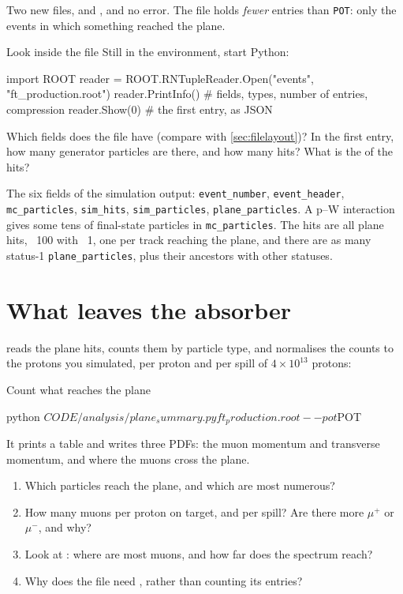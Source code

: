 \begin{checkpoint}
Two new files,  and
, and no error. The file holds
\emph{fewer} entries than \texttt{POT}: only the events in which something
reached the plane.
\end{checkpoint}

\begin{exercise}{Look inside the file}
\label{ex:openfile}
Still in the  environment, start Python:
\begin{py}
import ROOT
reader = ROOT.RNTupleReader.Open("events", "ft_production.root")
reader.PrintInfo()     # fields, types, number of entries, compression
reader.Show(0)         # the first entry, as JSON
\end{py}
Which fields does the file have (compare with \cref{sec:filelayout})? In the
first entry, how many generator particles are there, and how many hits? What
is the  of the hits?
\end{exercise}

\begin{solution}
The six fields of the simulation output: \texttt{event\_number},
\texttt{event\_header}, \texttt{mc\_particles}, \texttt{sim\_hits},
\texttt{sim\_particles}, \texttt{plane\_particles}. A p--W interaction gives
some tens of final-state particles in \texttt{mc\_particles}. The hits are
all plane hits, ~100 with ~1,
one per track reaching the plane, and there are as many status-1
\texttt{plane\_particles}, plus their ancestors with other statuses.
\end{solution}

\section{What leaves the absorber}

 reads the plane hits, counts them by
particle type, and normalises the counts to the protons you simulated, per
proton and per spill of $4\times10^{13}$ protons:

\begin{exercise}{Count what reaches the plane}
\label{ex:planesummary}
\begin{shell}
python $CODE/analysis/plane_summary.py ft_production.root --pot $POT
\end{shell}
It prints a table and writes three PDFs: the muon momentum and transverse
momentum, and where the muons cross the plane.
\begin{enumerate}
  \item Which particles reach the plane, and which are most numerous?
  \item How many muons per proton on target, and per spill? Are there more
        $\mu^+$ or $\mu^-$, and why?
  \item Look at : where are most muons, and how far
        does the spectrum reach?
  \item Why does the file need , rather than counting its entries?
\end{enumerate}
\end{exercise}

